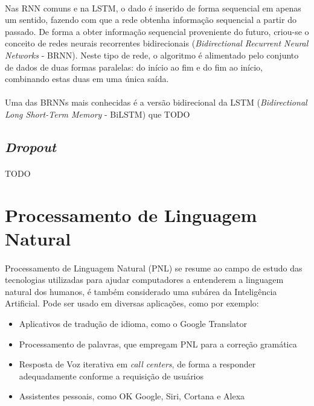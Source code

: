 \documentclass[grad,numbers]{coppe}
\begin{document}
  		\paragraph{}Nas RNN comuns e na LSTM, o dado é inserido de forma sequencial em apenas um sentido, fazendo com que a rede obtenha informação sequencial a partir do passado. De forma a obter informação sequencial proveniente do futuro, criou-se o conceito de redes neurais recorrentes bidirecionais (\textit{Bidirectional Recurrent Neural Networks} - BRNN). Neste tipo de rede, o algoritmo é alimentado pelo conjunto de dados de duas formas paralelas: do início ao fim e do fim ao início, combinando estas duas em uma única saída.
  		\paragraph{}Uma das BRNNs mais conhecidas é a versão bidirecional da LSTM (\textit{Bidirectional Long Short-Term Memory} - BiLSTM) que TODO
  	\subsection{\textit{Dropout}}
  		\paragraph{}TODO
	  	
  \section{Processamento de Linguagem Natural}
  	\paragraph{}Processamento de Linguagem Natural (PNL) se resume ao campo de estudo das tecnologias utilizadas para ajudar computadores a entenderem a linguagem natural dos humanos, é também considerado uma subárea da Inteligência Artificial. Pode ser usado em diversas aplicações\cite{simple-nlp}, como por exemplo:
  	\begin{itemize}
  		\item Aplicativos de tradução de idioma, como o Google Translator
  		\item Processamento de palavras, que empregam PNL para a correção gramática
  		\item Resposta de Voz iterativa em \textit{call centers}, de forma a responder adequadamente conforme a requisição de usuários
  		\item Assistentes pessoais, como OK Google, Siri, Cortana e Alexa
  	\end{itemize}
\end{document}

